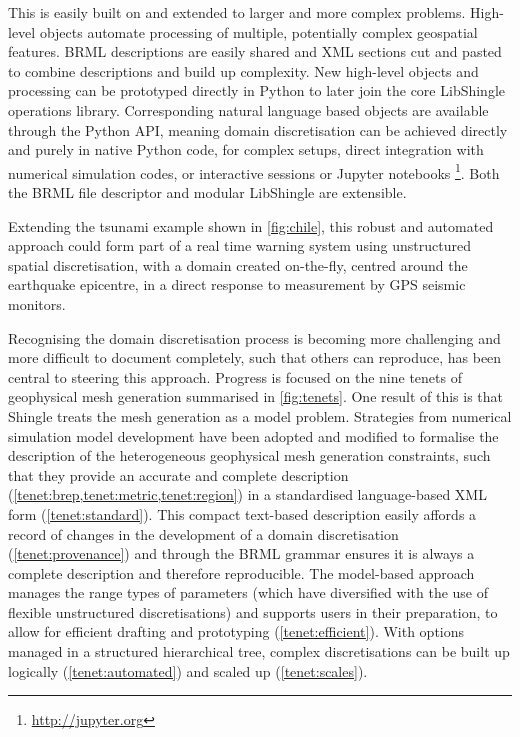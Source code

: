 \documentclass[a4paper, 10pt]{book}
\providecommand{\shingle}{Shingle\xspace}
\providecommand{\libshingle}{LibShingle\xspace}
\providecommand{\brml}{BRML\xspace}
\begin{document}
This is easily built on and extended to larger and more complex problems. 
High-level objects automate processing of multiple, potentially complex geospatial features.
\brml descriptions are easily shared and XML sections cut and pasted to combine descriptions and build up complexity.
New high-level objects and processing can be prototyped directly in Python to later join the core \libshingle operations library.
Corresponding natural language based objects are available through the Python API, meaning domain discretisation can be achieved directly
and purely in native Python code, for complex setups, direct integration with numerical simulation codes, or interactive sessions or 
Jupyter notebooks%
\footnote{\url{http://jupyter.org}}.
Both the \brml file descriptor and modular \libshingle are extensible.

Extending the tsunami example shown in \cref{fig:chile}, this robust and automated approach could form part of a real time warning system using unstructured spatial discretisation,
with a domain
created on-the-fly, centred around the earthquake epicentre, in a direct response to measurement by GPS seismic monitors.
%

Recognising the domain discretisation process is becoming more challenging 
and more difficult to document completely, such that others can reproduce, has been central
to steering this approach.
%
Progress is focused on the nine tenets of geophysical mesh generation summarised in
\cref{fig:tenets}.
%
One result of this is that \shingle treats the mesh generation as a model problem.
Strategies from 
numerical simulation model development have been adopted and modified
to formalise the description of the heterogeneous geophysical mesh generation constraints,
such that they provide an accurate and complete description
(\cref{tenet:brep,tenet:metric,tenet:region})
in a standardised language-based XML form 
(\cref{tenet:standard}).
%
This compact text-based description easily affords
a record of changes in the development of a domain discretisation
(\cref{tenet:provenance})
and through the \brml grammar ensures it is always a complete description and therefore reproducible.
%
The model-based approach manages the range types of parameters
(which have diversified with the use of flexible unstructured discretisations)
and supports users in their preparation,
to allow for efficient drafting and prototyping
(\cref{tenet:efficient}).
%
With options managed in a structured hierarchical tree,
complex discretisations can be built up logically
(\cref{tenet:automated})
and scaled up
(\cref{tenet:scales}).
\end{document}
